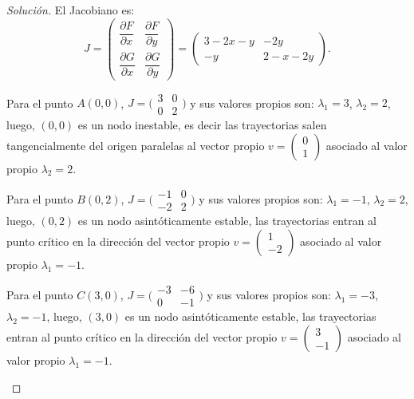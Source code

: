 \documentclass[a5paper,doc,10pt,noapacite]{apa6}
\begin{document}
{{\begin{proof}[Solución]
		El Jacobiano es: 
		\[
		J = \begin{pmatrix}\dfrac{\partial F}{\partial x} & \dfrac{\partial F}{\partial y} \\ \dfrac{\partial G}{\partial x} & \dfrac{\partial G}{\partial y} \end{pmatrix}=\begin{pmatrix} 3-2x-y & -2y \\ -y &  2-x-2y\end{pmatrix}.
		\]
		
		\begin{APAenumerate}
			\item Para el punto \(A(0,0)\), \(J=\Big(\begin{smallmatrix}  3 & 0 \\ 0 & 2\end{smallmatrix}\Big) \) y sus valores propios son: \(\lambda_1=3\), \(\lambda_2=2\), luego, \((0,0)\) es un nodo inestable, es decir las trayectorias salen tangencialmente del origen paralelas al vector propio \(v=\begin{pmatrix} 0 \\ 1\end{pmatrix}\) asociado al valor propio \(\lambda_2=2\).
			
			\item Para el punto \(B(0,2)\), \(J=\Big(\begin{smallmatrix}  -1 & 0 \\ -2 & 2 \end{smallmatrix}\Big) \) y sus valores propios son: \(\lambda_1=-1\), \(\lambda_2=2\), luego, \((0,2)\) es un nodo asintóticamente estable, las trayectorias entran al punto crítico en la dirección del vector propio \(v=\begin{pmatrix} 1 \\ -2\end{pmatrix}\) asociado al valor propio \(\lambda_1=-1\).
			
			\item Para el punto \(C(3,0)\), \(J=\Big(\begin{smallmatrix}  -3 & -6 \\ 0 & -1 \end{smallmatrix}\Big) \) y sus valores propios son: \(\lambda_1=-3\), \(\lambda_2=-1\), luego, \((3,0)\) es un nodo asintóticamente estable, las trayectorias entran al punto crítico en la dirección del vector propio \(v=\begin{pmatrix} 3 \\ -1\end{pmatrix}\) asociado al valor propio \(\lambda_1=-1\).
			

\end{APAenumerate}
\end{proof}}}
\end{document}
